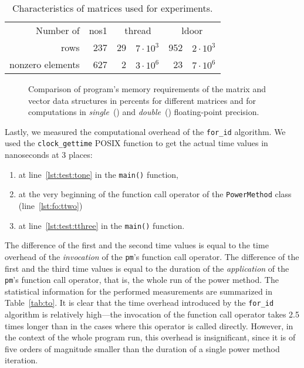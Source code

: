 \documentclass[10pt,a4paper]{article}
\theoremstyle{definition}\newtheorem{problem}{Problem}
\providecommand{\forid}{\texttt{for\_id}\xspace}
\begin{document}
\renewcommand{\arraystretch}{1.00}
\renewcommand{\tabcolsep}{3mm}
\begin{table}[t]
\caption{Characteristics of matrices used for experiments.}
\begin{center}
\begin{tabular}{rr *{2}{r@{.}l}}
\toprule
Number of & nos1 & \multicolumn{2}{c}{thread} & \multicolumn{2}{c}{ldoor} \\ \cmidrule(r){1-1} \cmidrule(l){2-6}
rows & 237 & 29 & $7\cdot 10^3$ & 952 & $2\cdot 10^3$ \rule[0.0em]{0pt}{1.15em} \\
nonzero elements & 627 & 2 & $3\cdot 10^6$ & 23 & $7\cdot 10^6$ \\
\bottomrule
\end{tabular}
\end{center}
\label{tab:mats}
\end{table}

\begin{figure}[t]
\centering
{}
\hspace{4mm}
\caption{Comparison of program's memory requirements of the matrix and vector data structures in percents for different matrices and for computations in \emph{single}~(\protect{}) and \emph{double}~(\protect{}) floating-point precision. }
\label{fig:mr}
\end{figure}

Lastly, we measured the computational overhead of the \forid algorithm. We used the \texttt{clock\_gettime} POSIX function to get the actual time values in nanoseconds at 3 places:
\begin{enumerate}

\item at line~\ref{lst:test:tone} in the \texttt{main()} function,

\item at the very beginning of the function call operator of the \texttt{PowerMethod} class (line~\ref{lst:fo:ttwo})

\item at line~\ref{lst:test:tthree} in the \texttt{main()} function.

\end{enumerate}
The difference of the first and the second time values is equal to the time overhead of the \emph{invocation} of the \texttt{pm}'s function call operator. The difference of the first and the third time values is equal to the duration of the \emph{application} of the \texttt{pm}'s function call operator, that is, the whole run of the power method. The statistical information for the performed measurements are summarized in Table~\ref{tab:to}. It is clear that the time overhead introduced by the \forid algorithm is relatively high---the invocation of the function call operator takes 2.5 times longer than in the cases where this operator is called directly. However, in the context of the whole program run, this overhead is insignificant, since it is of five orders of magnitude smaller than the duration of a single power method iteration.
\end{document}
